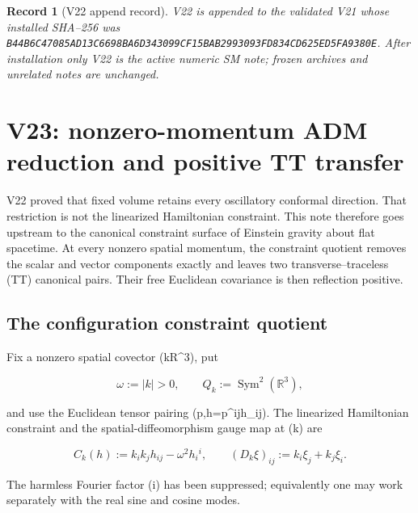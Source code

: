 \documentclass[11pt]{article}
\newtheorem{record}[theorem]{Record}
\theoremstyle{remark}
\begin{document}
\begin{record}[V22 append record]
\label{rec:v19v22}
V22 is appended to the validated V21 whose installed SHA--256 was
\texttt{B44B6C47085AD13C6698BA6D343099CF15BAB2993093FD834CD625ED5FA9380E}.
After installation only V22 is the active numeric SM note; frozen archives
and unrelated notes are unchanged.
\end{record}



\section{V23: nonzero-momentum ADM reduction and positive TT transfer}
\label{sec:v19v23}

V22 proved that fixed volume retains every oscillatory conformal direction.
That restriction is not the linearized Hamiltonian constraint.  This note
therefore goes upstream to the canonical constraint surface of Einstein
gravity about flat spacetime.  At every nonzero spatial momentum, the
constraint quotient removes the scalar and vector components exactly and
leaves two transverse--traceless (TT) canonical pairs.  Their free
Euclidean covariance is then reflection positive.

\subsection{The configuration constraint quotient}

Fix a nonzero spatial covector (k\in\mathbb R^3), put

\[
 \omega:=|k|>0,
 \qquad Q_k:=\operatorname{Sym}^2(\mathbb R^3),                 \tag{26.1}
\]

and use the Euclidean tensor pairing
(\langle p,h\rangle=p^{ij}h_{ij}).  The linearized Hamiltonian
constraint and the spatial-diffeomorphism gauge map at (k) are

\[
 C_k(h):=k_ik_jh_{ij}-\omega^2 h_i{}^i,
 \qquad
 (D_k\xi)_{ij}:=k_i\xi_j+k_j\xi_i.                            \tag{26.2}
\]

The harmless Fourier factor (i) has been suppressed; equivalently one
may work separately with the real sine and cosine modes.
\end{document}

